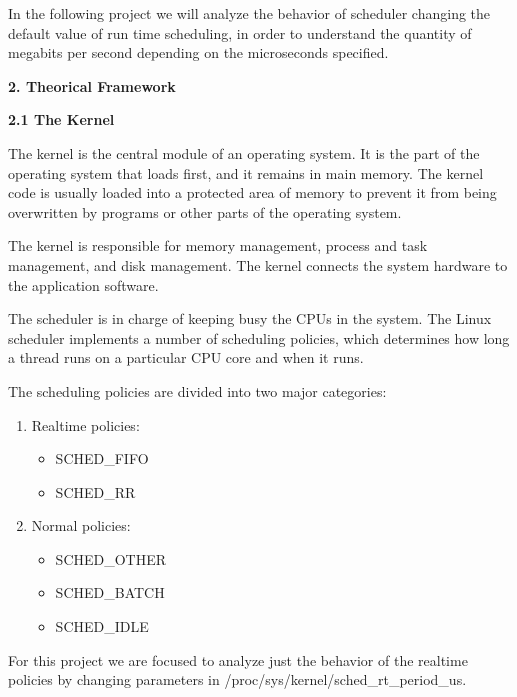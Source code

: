 \documentclass[english]{article}
\begin{document}
In the following project we will analyze the behavior of scheduler changing the default value of run time scheduling, in order to understand the quantity of megabits per second depending on the microseconds specified.

\vspace{1cm}
\begin{center}
{\bf 2. Theorical Framework}
\end{center}

{\bf 2.1 The Kernel}

The kernel is the central module of an operating system. It is the part of the operating system that loads first, and it remains in main memory. The kernel code is usually loaded into a protected area of memory to prevent it from being overwritten by programs or other parts of the operating system.

The kernel is responsible for memory management, process and task management, and disk management. The kernel connects the system hardware to the application software. 

\vspace{2.5cm}{\bf 2.2 The Scheduler}

The scheduler is in charge of keeping busy the CPUs in the system. The Linux scheduler implements a number of scheduling policies, which determines how long a thread runs on a particular CPU core and when it runs.

The scheduling policies are divided into two major categories:

\begin{enumerate}
\item Realtime policies:
\begin{itemize}
\item SCHED\_FIFO
\item SCHED\_RR
\end{itemize}

\item Normal policies:
\begin{itemize}
\item SCHED\_OTHER
\item SCHED\_BATCH
\item SCHED\_IDLE
\end{itemize}
\end{enumerate}

For this project we are focused to analyze just the behavior of the realtime policies by changing parameters in /proc/sys/kernel/sched\_rt\_period\_us.
\end{document}
